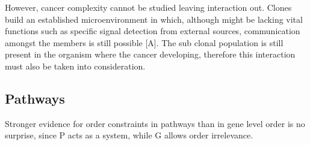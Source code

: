 However, cancer complexity cannot be studied leaving interaction out. Clones build an established microenvironment in which, although might be lacking vital functions such as specific signal detection from external sources, communication amongst the members is still possible [A]. The sub clonal population is still present in the organism where the cancer developing, therefore this interaction must also be taken into consideration.


\subsection{Pathways}
Stronger evidence for order constraints in pathways than in gene level order is no surprise, since P acts as a system, while G allows order irrelevance.